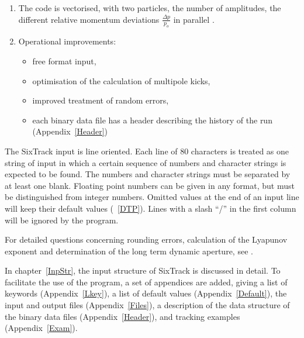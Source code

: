 \begin{enumerate}
  \item The code is vectorised, with two particles, the number of amplitudes, the different relative momentum deviations \mbox{$ \frac{\Delta p}{p_o} $} in parallel \cite{Sixvec}.
  \item Operational improvements:
  \begin{itemize}
    \item free format input,
    \item optimisation of the calculation of multipole kicks,
    \item improved treatment of random errors,
    \item each binary data file has a header describing the history of the run (Appendix~\ref{Header})
  \end{itemize}
\end{enumerate}

The SixTrack input is line oriented.
Each line of 80 characters is treated as one string of input in which a certain sequence of numbers and character strings is expected to be found.
The numbers and character strings must be separated by at least one blank.
Floating point numbers can be given in any format, but must be distinguished from integer numbers.
Omitted values at the end of an input line will keep their default values (~\ref{DTP}).
Lines with a slash ``/'' in the first column will be ignored by the program.

For detailed questions concerning rounding errors, calculation of the Lyapunov exponent and determination of the long term dynamic aperture, see \cite{thesis}.

In chapter~\ref{InpStr}, the input structure of SixTrack is discussed in detail.
To facilitate the use of the program, a set of appendices are added,
  giving a list of keywords \mbox{(Appendix~\ref{Lkey}),}
  a list of default values \mbox{(Appendix~\ref{Default}),}
  the input and output files \mbox{(Appendix~\ref{Files}),}
  a description of the data structure of the binary data files \mbox{(Appendix~\ref{Header}),}
  and tracking examples \mbox{(Appendix~\ref{Exam}).}

